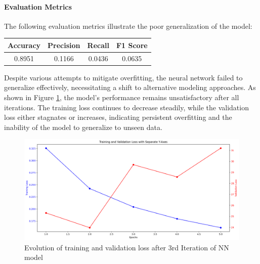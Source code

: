 \documentclass[conference,9pt]{IEEEtran}
\begin{document}
\paragraph{Evaluation Metrics}
The following evaluation metrics illustrate the poor generalization of the model:
\begin{center}
    \begin{tabular}{c|c|c|c}
        Accuracy & Precision & Recall & F1 Score \\ 
        \hline 
        0.8951 & 0.1166 &  0.0436 & 0.0635\\
    \end{tabular}
\end{center}
Despite various attempts to mitigate overfitting, the neural network failed to generalize effectively, necessitating a shift to alternative modeling approaches. As shown in Figure \ref{fig:It3}, the model's performance remains unsatisfactory after all iterations. The training loss continues to decrease steadily, while the validation loss either stagnates or increases, indicating persistent overfitting and the inability of the model to generalize to unseen data.
\begin{figure}[h]
    \centering
    \includegraphics[width=\columnwidth]{../training_validation_loss_Iteration3.png}
    \caption{Evolution of training and validation loss after 3rd Iteration of NN model}
    \label{fig:It3}
\end{figure}
\end{document}
